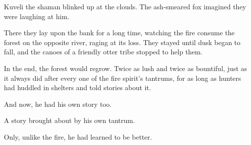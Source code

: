 Kuveli the shaman blinked up at the clouds. The ash-smeared fox imagined they were laughing at him.

There they lay upon the bank for a long time, watching the fire consume the forest on the opposite river, raging at its loss. They stayed until dusk began to fall, and the canoes of a friendly otter tribe stopped to help them.

In the end, the forest would regrow. Twice as lush and twice as bountiful, just as it always did after every one of the fire spirit's tantrums, for as long as hunters had huddled in shelters and told stories about it.

And now, he had his own story too.

A story brought about by his own tantrum.

Only, unlike the fire, he had learned to be better.
